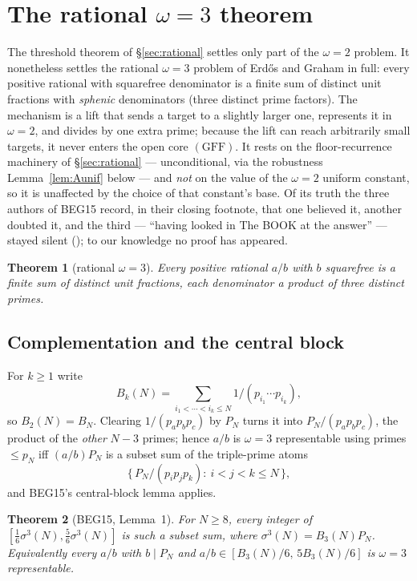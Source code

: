 \documentclass[11pt]{amsart}
\theoremstyle{plain}
\newtheorem{theorem}{Theorem}[section]
\theoremstyle{definition}
\begin{document}
\section{The rational $\omega=3$ theorem}\label{sec:omega3}

The threshold theorem of \S\ref{sec:rational} settles only part of the $\omega=2$
problem.  It nonetheless settles the rational $\omega=3$ problem of Erd\H{o}s and Graham in
full: every positive rational with squarefree denominator is a finite sum of
distinct unit fractions with \emph{sphenic} denominators (three distinct prime
factors).  The
mechanism is a lift that sends a target to a slightly larger one, represents it in
$\omega=2$, and divides by one extra prime; because the lift can reach arbitrarily
small targets, it never enters the open core $(\mathrm{GFF})$.  It rests on the
floor-recurrence machinery of \S\ref{sec:rational} --- unconditional, via the
robustness Lemma~\ref{lem:Aunif} below --- and \emph{not} on the value of the
$\omega=2$ uniform constant, so it is unaffected by the choice of that constant's
base.  Of its truth the three authors of BEG15
record, in their closing footnote, that one believed it, another doubted it, and
the third --- ``having looked in The BOOK at the answer'' --- stayed silent
(\cite{BEG2015}); to our knowledge no proof has appeared.

\begin{theorem}[rational $\omega=3$]\label{thm:omega3}
Every positive rational $a/b$ with $b$ squarefree is a finite sum of distinct unit
fractions, each denominator a product of three distinct primes.
\end{theorem}

\subsection{Complementation and the central block}
For $k\ge1$ write
\[
  B_k(N)=\sum_{i_1<\cdots<i_k\le N}1/(p_{i_1}\cdots p_{i_k}),
\]
so $B_2(N)=B_N$.  Clearing $1/(p_ap_bp_c)$ by $P_N$ turns
it into $P_N/(p_ap_bp_c)$, the product of the \emph{other} $N-3$ primes; hence
$a/b$ is $\omega=3$ representable using primes $\le p_N$ iff $(a/b)P_N$ is a subset
sum of the triple-prime atoms
\[
  \{\,P_N/(p_ip_jp_k):\ i<j<k\le N\,\},
\]
and BEG15's central-block lemma applies.

\begin{theorem}[BEG15, Lemma~1]\label{thm:beg3}
For $N\ge8$, every integer of $[\tfrac16\sigma^3(N),\tfrac56\sigma^3(N)]$ is such a
subset sum, where $\sigma^3(N)=B_3(N)P_N$.  Equivalently every $a/b$ with
$b\mid P_N$ and $a/b\in[B_3(N)/6,\,5B_3(N)/6]$ is $\omega=3$ representable.
\end{theorem}
\end{document}
